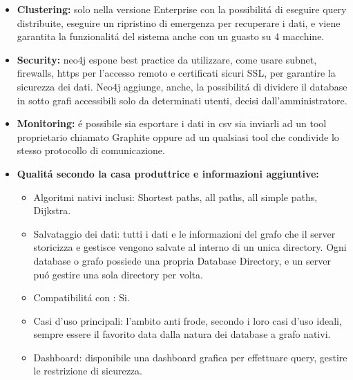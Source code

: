 \begin{itemize}
\item\textbf{Clustering:} solo nella versione Enterprise con la possibilit\'a di eseguire query distribuite, eseguire un ripristino di emergenza per recuperare i dati, e viene garantita la funzionalit\'a del sistema anche con un guasto su 4 macchine.
\item\textbf{Security:} neo4j espone best practice da utilizzare, come usare subnet, firewalls, https per l'accesso remoto e certificati sicuri SSL, per garantire la sicurezza dei dati. Neo4j aggiunge, anche, la possibilit\'a di dividere il database in sotto grafi accessibili solo da determinati utenti, decisi dall'amministratore.
\item\textbf{Monitoring:} \'e possibile sia esportare i dati in csv sia inviarli ad un tool proprietario chiamato Graphite oppure ad un qualsiasi tool che condivide lo stesso protocollo di comunicazione.
\item\textbf{Qualit\'a secondo la casa produttrice e informazioni aggiuntive:} 
\begin{itemize}
\item{Algoritmi nativi inclusi:} Shortest paths, all paths, all simple paths,  Dijkstra.
\item{Salvataggio dei dati:} tutti i dati e le informazioni del grafo che il server storicizza e gestisce vengono salvate al interno di un unica directory. Ogni database o grafo possiede una propria Database Directory, e un server pu\'o gestire una sola directory per volta.
\item{Compatibilit\'a con :} Si.
\item{Casi d'uso principali}: l'ambito anti frode, secondo i loro casi d'uso ideali, sempre essere il favorito data dalla natura dei database a grafo nativi.
\item{Dashboard:} disponibile una dashboard grafica per effettuare query, gestire le restrizione di sicurezza.
\end{itemize}
\end{itemize}


